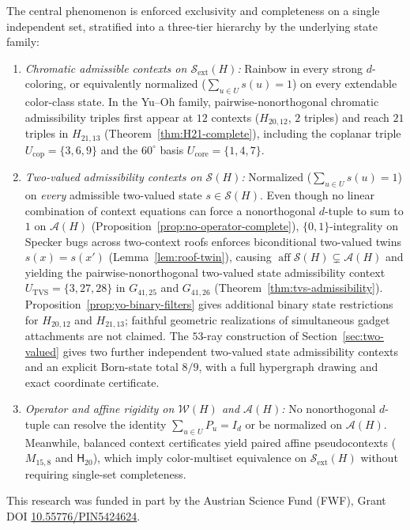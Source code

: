 \documentclass[aps,pra,reprint,superscriptaddress,longbibliography,nofootinbib,floatfix,10pt]{revtex4-2}
\theoremstyle{definition}\newtheorem{definition}[theorem]{Definition}
\theoremstyle{remark}\newtheorem{remark}[theorem]{Remark}
\newcommand{\Sc}{\mathcal S}\newcommand{\Cc}{\mathcal C}\newcommand{\Wc}{\mathcal W}
\newcommand{\Htwenty}{\mathsf H_{20}}
\begin{document}
The central phenomenon is enforced exclusivity and completeness on a single independent set, stratified into a three-tier hierarchy by the underlying state family:
\begin{enumerate}
\item \emph{Chromatic admissible contexts on $\Sc_{\mathrm{ext}}(H)$:} Rainbow in every strong $d$-coloring, or equivalently normalized ($\sum_{u\in U}s(u)=1$) on every extendable color-class state. In the Yu--Oh family, pairwise-nonorthogonal chromatic admissibility triples first appear at $12$ contexts ($H_{20,12}$, $2$ triples) and reach $21$ triples in $H_{21,13}$ (Theorem~\ref{thm:H21-complete}), including the coplanar triple $U_{\mathrm{cop}}=\{3,6,9\}$ and the $60^\circ$ basis $U_{\mathrm{core}}=\{1,4,7\}$.
\item \emph{Two-valued admissibility contexts on $\Sc(H)$:} Normalized ($\sum_{u\in U}s(u)=1$) on \emph{every} admissible two-valued state $s\in\Sc(H)$. Even though no linear combination of context equations can force a nonorthogonal $d$-tuple to sum to $1$ on $\mathcal A(H)$ (Proposition~\ref{prop:no-operator-complete}), $\{0,1\}$-integrality on Specker bugs across two-context roofs enforces biconditional two-valued twins $s(x)=s(x')$ (Lemma~\ref{lem:roof-twin}), causing $\operatorname{aff}\Sc(H)\subsetneq\mathcal A(H)$ and yielding the pairwise-nonorthogonal two-valued state admissibility context $U_{\mathrm{TVS}}=\{3,27,28\}$ in $G_{41,25}$ and $G_{41,26}$ (Theorem~\ref{thm:tvs-admissibility}). Proposition~\ref{prop:yo-binary-filters} gives additional binary state restrictions for $H_{20,12}$ and $H_{21,13}$; faithful geometric realizations of simultaneous gadget attachments are not claimed. The $53$-ray construction of Section~\ref{sec:two-valued} gives two further independent two-valued state admissibility contexts and an explicit Born-state total $8/9$, with a full hypergraph drawing and exact coordinate certificate.
\item \emph{Operator and affine rigidity on $\Wc(H)$ and $\mathcal A(H)$:} No nonorthogonal $d$-tuple can resolve the identity $\sum_{u\in U}P_u=I_d$ or be normalized on $\mathcal A(H)$. Meanwhile, balanced context certificates yield paired affine pseudocontexts ($M_{15,8}$ and $\Htwenty$), which imply color-multiset equivalence on $\Sc_{\mathrm{ext}}(H)$ without requiring single-set completeness.
\end{enumerate}

\begin{acknowledgments}
This research was funded in part by the Austrian Science Fund (FWF), Grant DOI \href{https://doi.org/10.55776/PIN5424624}{10.55776/PIN5424624}.
\end{acknowledgments}


\end{document}
